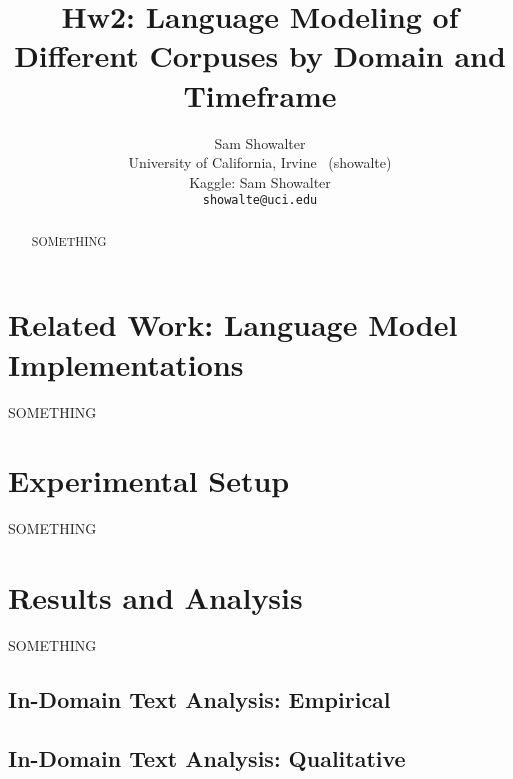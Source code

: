 \documentclass[11pt,a4paper]{article}
\title{Hw2: Language Modeling of Different Corpuses by Domain and Timeframe}
\author{Sam Showalter \\
  University of California, Irvine \ (showalte) \\  
  Kaggle: Sam Showalter \\
\texttt{showalte@uci.edu}}
\date{}
\begin{document}
\maketitle
\begin{abstract}
  SOMETHING \cite{zhang2010understanding}
\end{abstract}


\section{Related Work: Language Model Implementations}

SOMETHING


\section{Experimental Setup}%
\label{sec:experimental_setup}

SOMETHING


\section{Results and Analysis}%
\label{sec:results_analysis}

SOMETHING


\subsection{In-Domain Text Analysis: Empirical}%
\label{sec:in_domain_text_analysis_empirical}


\subsection{In-Domain Text Analysis: Qualitative}%
\label{sub:in_domain_text_analysis_qualitative}
\end{document}
